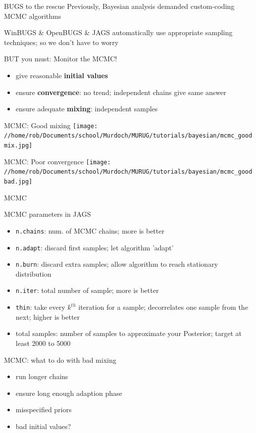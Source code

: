 \documentclass[presentation,9pt,xcolor=dvipsnames]{beamer}
\begin{document}
\begin{frame}[label={sec:orgd09b0bc}]{BUGS to the rescue}
Previously, Bayesian analysis demanded custom-coding MCMC algorithms
\begin{block}{WinBUGS \& OpenBUGS \& JAGS}
automatically use appropriate sampling techniques; so we don't have to worry
\end{block}
\begin{block}{BUT you must: Monitor the MCMC!}
\begin{itemize}
\item give reasonable \textbf{initial values}
\item ensure \textbf{convergence}: no trend; independent chains give same answer
\item ensure adequate \textbf{mixing}: independent samples
\end{itemize}
\end{block}
\end{frame}
\begin{frame}[label={sec:orgf093419}]{MCMC: Good mixing}
\texttt{[image: //home/rob/Documents/school/Murdoch/MURUG/tutorials/bayesian/mcmc\_goodmix.jpg]}
\end{frame}
\begin{frame}[label={sec:org747f783}]{MCMC: Poor convergence}
\texttt{[image: //home/rob/Documents/school/Murdoch/MURUG/tutorials/bayesian/mcmc\_goodbad.jpg]}
\end{frame}
\begin{frame}[fragile,label={sec:org08776c3}]{MCMC}
 \begin{block}{MCMC parameters in JAGS}
\begin{itemize}
\item \texttt{n.chains}: num. of MCMC chains; more is better
\item \texttt{n.adapt}: discard first samples; let algorithm 'adapt'
\item \texttt{n.burn}: discard extra samples; allow algorithm to reach stationary distribution
\item \texttt{n.iter}: total number of sample; more is better
\item \texttt{thin}: take every \(k^{th}\) iteration for a sample; decorrelates one sample from the next; higher is better
\item total samples: number of samples to approximate your Posterior; target at least 2000 to 5000
\end{itemize}
\end{block}
\end{frame}
\begin{frame}[label={sec:org921410b}]{MCMC: what to do with bad mixing}
\begin{itemize}
\item run longer chains
\item ensure long enough adaption phase
\item misspecified priors
\item bad initial values?
\end{itemize}
\end{frame}
\end{document}
